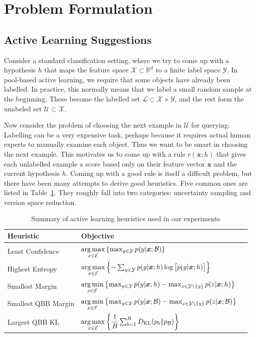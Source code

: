 \documentclass[fleqn,10pt,lineno]{wlpeerj} %
\newcommand{\B}{\mathcal{B}}
\newcommand{\X}{\mathcal{X}}
\newcommand{\Y}{\mathcal{Y}}
\newcommand{\Ecal}{\mathcal{E}}
\newcommand{\Unlabelled}{\mathcal{U}}
\newcommand{\Labelled}{\mathcal{L}}
\newcommand*{\argmin}{\operatornamewithlimits{arg\,min}\limits}
\newcommand*{\argmax}{\operatornamewithlimits{arg\,max}\limits}
\begin{document}
\section*{Problem Formulation}

\subsection*{Active Learning Suggestions}

Consider a standard classification setting, where we try to come up with a
hypothesis $h$ that maps the feature space $\X \subset \mathbb{R}^d$ to a
finite label space $\Y$. In pool-based active learning, we require that some
objects have already been labelled. In practice, this normally means that we
label a small random sample at the beginning. These become the labelled set
$\Labelled \subset \X \times \Y$, and the rest form the unabeled set
$\Unlabelled \subset \X$.

Now consider the problem of choosing the next example in $\Unlabelled$ for
querying. Labelling can be a very expensive task, perhaps because it requires
actual human experts to manually examine each object. Thus we want to be smart
in choosing the next example. This motivates us to come up with a rule
$r(\bm{x}; h)$ that gives each unlabelled example a score based only on their
feature vector $\bm{x}$ and the current hypothesis $h$. Coming up with a good
rule is itself a difficult problem, but there have been many attempts to derive
good heuristics. Five common ones are listed in Table~\ref{tab:heuristics}.
They roughly fall into two categories: uncertainty sampling and version space
reduction.

\begin{table}[h]
	\caption {Summary of active learning heuristics used in our experiments}
	\label{tab:heuristics}
	\centering
	\begin{tabular}{lll}
		\toprule
		{Heuristic}  &  Objective  \\
		\midrule
        Least Confidence &
			$\argmax_{x \in \Ecal}
			\left\{ \max_{y \in \Y} p(y | \bm{x}; \B) \right\}$ \\
		Highest Entropy &
			$\argmax_{x \in \Ecal} \left\{-\sum_{y \in \Y} p(y | \bm{x}; h)
            \log \big[ p(y | \bm{x}; h) \big] \right\}$
			\\[2ex]
		Smallest Margin &
			$\argmin_{x \in \Ecal} \left\{ \max_{y \in \Y} p(y | \bm{x}; h) -
            \max_{z \in \Y \setminus \{y\}} p(z | \bm{x}; h)  \right\}$
			\\[2ex]
		Smallest QBB Margin &
			$\argmin_{x \in \Ecal} \left\{ \max_{y \in \Y} p(y | \bm{x}; \B) -
            \max_{z \in \Y \setminus \{y\}} p(z | \bm{x}; \B)  \right\}$
			\\[2ex]
		Largest QBB KL &
			$\argmax_{x \in \Ecal} \left\{ \dfrac{1}{B}
               \sum_{b=1}^B D_{\mathrm{KL}}(p_b\|p_\B) \right\}$
			\\
		\bottomrule
	\end{tabular}
\end{table}
\end{document}

